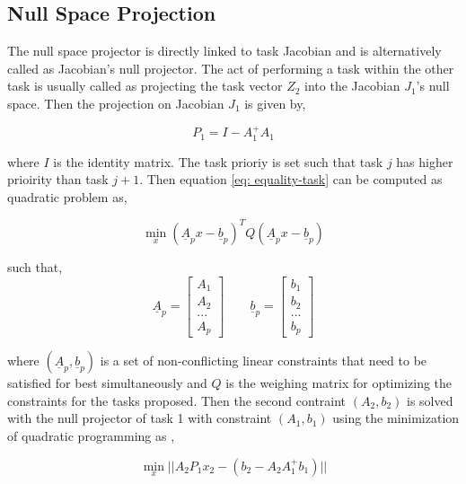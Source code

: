\subsection{Null Space Projection}

The null space projector is directly linked to task Jacobian and is alternatively called as Jacobian's null projector. The act of performing a task within the other task is usually called as
projecting the task vector $Z_2$ into the Jacobian $J_1$'s null space. Then the projection on Jacobian $J_1$ is given by,

\begin{equation}
    \label{eq: null-space-1}
    P_1 = I - A_1^+ A_1
\end{equation}

where $I$ is the identity matrix. The task prioriy is set such that task $j$ has higher prioirity than task $j+1$. Then equation \ref{eq: equality-task} can be computed as quadratic problem as,

\begin{equation}
    \label{eq: null-space-2}
    \min_x(\underline{A}_p x - \underline{b}_p)^T Q (\underline{A}_p x - \underline{b}_p) 
\end{equation}

such that,
\begin{equation*}
    \underline{A}_p = \begin{bmatrix}
        A_1 \\ A_2 \\ ... \\ A_p
    \end{bmatrix} \qquad 
    \underline{b}_p = \begin{bmatrix}
        b_1 \\ b_2 \\ ... \\ b_p
    \end{bmatrix}
\end{equation*}


where $(\underline{A}_p, \underline{b}_p)$ is a set of non-conflicting linear constraints that need to be satisfied for best simultaneously and $Q$ is the weighing matrix for optimizing the constraints for the tasks proposed.
Then the  second contraint $(A_2, b_2)$ is solved with the null projector of task 1 with constraint $(A_1, b_1)$ using the minimization of quadratic programming as \cite{escande2014hierarchical},

\begin{equation}
    \label{eq: null-space-3}
    \min_x ||A_2P_1x_2 - (b_2 - A_2A_1^+b_1)||
\end{equation}


